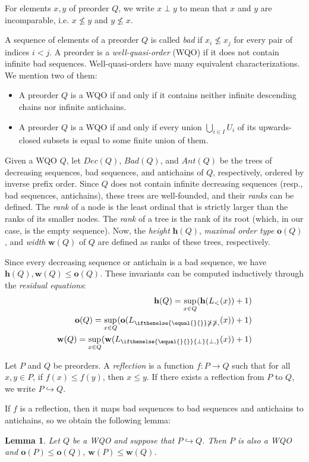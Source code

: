 \documentclass[10pt,a4paper]{amsart}
\let \leq \leqslant
\let \ngeq \ngeqslant
\let \embeds \hookrightarrow
\renewcommand \L [2][]{L_{\ifthenelse{\equal{#1}{}}\ngeq{\ngeq,#1}}(#2)}
\renewcommand \l [2][]{\o(\L[#1]{#2})}
\newcommand \K [2][]{L_{\ifthenelse{\equal{#1}{}}{\bot}{\bot,#1}}(#2)}
\renewcommand \k [2][]{\w(\K[#1]{#2})}
\def \h {\textbf{h}}
\def \o {\textbf{o}}
\def \w {\textbf{w}}
\newtheorem{lemma}{Lemma}
\begin{document}
For elements $x, y$ of preorder $Q$, we write $x \perp y$ to mean that $x$ and $y$ are incomparable, i.e. $x \not\leq y$ and $y \not\leq x$.

A sequence of elements of a preorder $Q$ is called \textit{bad} if $x_i \not\leq x_j$ for every pair of indices $i < j$. A preorder is a \textit{well-quasi-order} (WQO) if it does not contain infinite bad sequences. Well-quasi-orders have many equivalent characterizations. We mention two of them:
\begin{itemize}
    \item A preorder $Q$ is a WQO if and only if it contains neither infinite descending chains nor infinite antichains.
    \item A preorder $Q$ is a WQO if and only if every union $\bigcup_{i \in I} U_i$ of its upwards-closed subsets is equal to some finite union of them.
\end{itemize}

Given a WQO $Q$, let $Dec(Q)$, $Bad(Q)$, and $Ant(Q)$ be the trees of decreasing sequences, bad sequences, and antichains of $Q$, respectively, ordered by inverse prefix order. Since $Q$ does not contain infinite decreasing sequences (resp., bad sequences, antichains), these trees are well-founded, and their \textit{ranks} can be defined. The \textit{rank} of a node is the least ordinal that is strictly larger than the ranks of its smaller nodes. The \textit{rank} of a tree is the rank of its root (which, in our case, is the empty sequence). Now, the \textit{height} $\h(Q)$, \textit{maximal order type} $\o(Q)$, and \textit{width} $\w(Q)$ of $Q$ are defined as ranks of these trees, respectively.

Since every decreasing sequence or antichain is a bad sequence, we have $\h(Q), \w(Q) \leq \o(Q)$. These invariants can be computed inductively through the \textit{residual equations}:
\begin{align*}
    \h(Q) = \sup_{x \in Q} (\h(L_<(x)) + 1)\\
    \o(Q) = \sup_{x \in Q} (\l{x} + 1)\\
    \w(Q) = \sup_{x \in Q} (\k{x} + 1)
\end{align*}

Let $P$ and $Q$ be preorders. A \textit{reflection} is a function $f \colon P \to Q$ such that for all $x, y \in P$, if $f(x) \leq f(y)$, then $x \leq y$. If there exists a reflection from $P$ to $Q$, we write $P \embeds Q$.

If $f$ is a reflection, then it maps bad sequences to bad sequences and antichains to antichains, so we obtain the following lemma:
\begin{lemma}\label{embedding}
    Let $Q$ be a WQO and suppose that $P \embeds Q$. Then $P$ is also a WQO and $\o(P) \leq \o(Q)$, $\w(P) \leq \w(Q)$.
\end{lemma}
\end{document}
